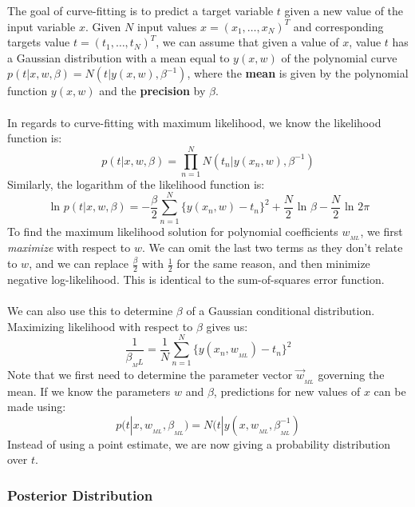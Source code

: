 \documentclass[11pt]{article} %
\begin{document}
The goal of curve-fitting is to predict a target variable $t$ given a new value of the input variable $x$. Given $N$ input values $x=(x_1,\ldots,x_N)^T$ and corresponding targets value $t=(t_1,\ldots,t_N)^T$, we can assume that given a value of $x$, value $t$ has a Gaussian distribution with a mean equal to $y(x,w)$ of the polynomial curve $p(t|x,w,\beta) = N(t|y(x,w),\beta^{-1})$, where the {\bf mean} is given by the polynomial function $y(x,w)$ and the {\bf precision} by $\beta$.\\
~\\
In regards to curve-fitting with maximum likelihood, we know the likelihood function is:
\begin{equation}
p(t|x,w,\beta) = \prod_{n=1}^{N} N(t_n | y(x_n,w), \beta^{-1})
\end{equation}
Similarly, the logarithm of the likelihood function is:
\begin{equation}
\text{ ln } p(t|x,w,\beta) = - \frac{\beta}{2} \sum_{n=1}^{N} \{ y(x_n,w)-t_n\}^2 + \frac{N}{2} \text{ ln }\beta - \frac{N}{2} \text{ ln } 2\pi
\end{equation}
To find the maximum likelihood solution for polynomial coefficients $w_{_{ML}}$, we first {\em maximize} with respect to $w$. We can omit the last two terms as they don't relate to $w$, and we can replace $\frac{\beta}{2}$ with $\frac{1}{2}$ for the same reason, and then minimize negative log-likelihood. This is identical to the sum-of-squares error function. \\
~\\
We can also use this to determine $\beta$ of a Gaussian conditional distribution. Maximizing likelihood with respect to $\beta$ gives us:
\begin{equation}
\frac{1}{\beta_{_ML}} = \frac{1}{N} \sum_{n=1}^{N} \{ y(x_n,w_{_{ML}}) - t_n\}^2
\end{equation}
Note that we first need to determine the parameter vector $\vec{w}_{_{ML}}$ governing the mean. If we know the parameters $w$ and $\beta$, predictions for new values of $x$ can be made using:
\begin{equation}
p(t|x,w_{_{ML}},\beta_{_{ML}}) = N(t|y(x,w_{_{ML}},\beta_{_{ML}}^{-1})
\end{equation}
Instead of using a point estimate, we are now giving a probability distribution over $t$.

\subsubsection{Posterior Distribution}
\end{document}
